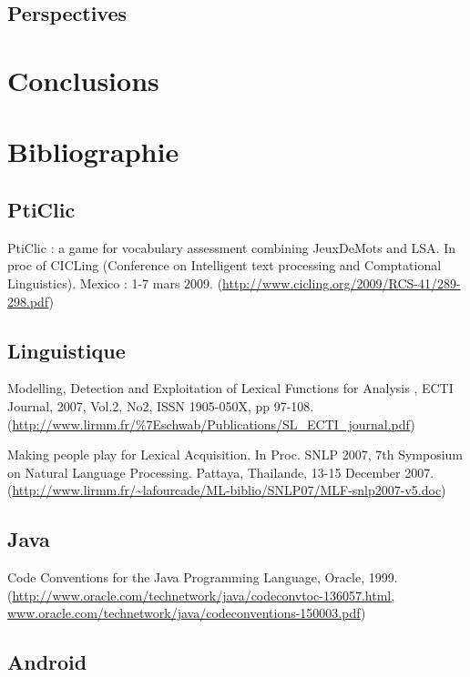 \documentclass[a4paper,11pt,french]{article}
\def\android{Android\texttrademark{}}
\begin{document}
\subsection{Perspectives}

\section{Conclusions}

\newpage


\section{Bibliographie}
\subsection{PtiClic}

PtiClic : a game for vocabulary assessment combining JeuxDeMots and LSA. In proc of CICLing (Conference on Intelligent text processing and Comptational Linguistics). Mexico : 1-7 mars 2009. (\url{http://www.cicling.org/2009/RCS-41/289-298.pdf})


\subsection{Linguistique}

Modelling, Detection and Exploitation of Lexical Functions for Analysis , ECTI Journal, 2007, Vol.2, No2, ISSN 1905-050X, pp 97-108. (\url{http://www.lirmm.fr/\%7Eschwab/Publications/SL_ECTI_journal.pdf})

Making people play for Lexical Acquisition. In Proc. SNLP 2007, 7th Symposium on Natural Language Processing. Pattaya, Thailande, 13-15 December 2007. (\url{http://www.lirmm.fr/~lafourcade/ML-biblio/SNLP07/MLF-snlp2007-v5.doc})


\subsection{Java}

Code Conventions for the Java Programming Language, Oracle, 1999. (\url{http://www.oracle.com/technetwork/java/codeconvtoc-136057.html, www.oracle.com/technetwork/java/codeconventions-150003.pdf})

\subsection{\android{}}
\end{document}
